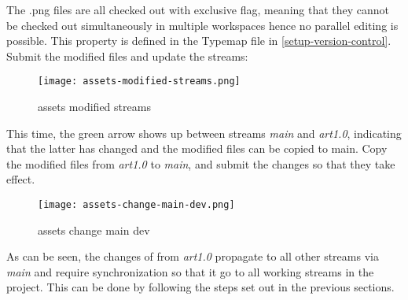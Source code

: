 The .png files are all checked out with exclusive flag, meaning that they cannot be checked out simultaneously 
in multiple workspaces hence no parallel editing is possible. This property is defined in the Typemap file in
\ref{setup-version-control}. Submit the modified files and update the streams:
\begin{figure}[H]
    \centering
    \texttt{[image: assets-modified-streams.png]}
    \setlength{\belowcaptionskip}{-10pt}
    \caption{assets modified streams}
    \label{fig:assets-modified-streams}
\end{figure}
This time, the green arrow shows up between streams \textit{main} and \textit{art1.0}, indicating that the latter has
changed and the modified files can be copied to main. Copy the modified files from \textit{art1.0} to \textit{main}, 
and submit the changes so that they take effect.
\begin{figure}[H]
    \centering
    \texttt{[image: assets-change-main-dev.png]}
    \setlength{\belowcaptionskip}{-10pt}
    \caption{assets change main dev}
    \label{fig:assets-change-main-dev}
\end{figure}
As can be seen, the changes of from \textit{art1.0} propagate to all other streams via \textit{main} and require 
synchronization so that it go to all working streams in the project. This can be done by following the steps set out in
the previous sections.